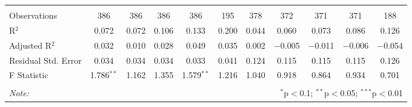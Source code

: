 \begin{table}[H]
\begin{tabular}{@{\extracolsep{4pt}}lcccccccccc}
  & & & & & & & & & & \\ 
\hline \\[-1.8ex] 
Observations & 386 & 386 & 386 & 386 & 195 & 378 & 372 & 371 & 371 & 188 \\ 
R$^{2}$ & 0.072 & 0.072 & 0.106 & 0.133 & 0.200 & 0.044 & 0.060 & 0.073 & 0.086 & 0.126 \\ 
Adjusted R$^{2}$ & 0.032 & 0.010 & 0.028 & 0.049 & 0.035 & 0.002 & $-$0.005 & $-$0.011 & $-$0.006 & $-$0.054 \\ 
Residual Std. Error & 0.034 & 0.034 & 0.034 & 0.033 & 0.041 & 0.124 & 0.115 & 0.115 & 0.115 & 0.126 \\ 
F Statistic & 1.786$^{**}$ & 1.162 & 1.355 & 1.579$^{**}$ & 1.216 & 1.040 & 0.918 & 0.864 & 0.934 & 0.701 \\ 
\hline 
\hline \\[-1.8ex] 
\textit{Note:}  & \multicolumn{10}{r}{$^{*}$p$<$0.1; $^{**}$p$<$0.05; $^{***}$p$<$0.01} \\ 
\end{tabular} 
\end{table} 

